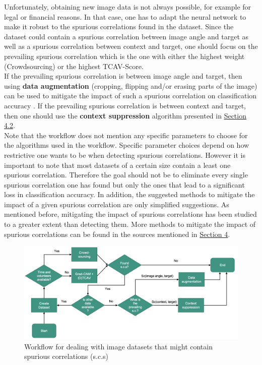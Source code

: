 \documentclass{article}
\begin{document}
Unfortunately, obtaining new image data is not always possible, for example for legal or financial reasons. In that case, one has to adapt the neural network
to make it robust to the spurious correlations found in the dataset. Since the dataset could contain a spurious correlation between image angle and target
as well as a spurious correlation between context and target, one should focus on the prevailing spurious correlation which is the one with either
the highest weight (Crowdsourcing) or the highest TCAV-Score. \\
If the prevailing spurious correlation is between image angle and target, then using \textbf{data augmentation} (cropping, flipping and/or erasing parts of the image)
can be used to mitigate the impact of such a spurious correlation on classification accuracy \cite{Agarwal_2020_CVPR}.
If the prevailing spurious correlation is between context and target, then one should use the \textbf{context suppression} algorithm presented in
\hyperref[sec:contextSuppr]{Section 4.2}. \\
Note that the workflow does not mention any specific parameters to choose for the algorithms used in the workflow. Specific parameter choices depend on how restrictive
one wants to be when detecting spurious correlations. However it is important to note that most datasets of a certain size contain a least one spurious correlation.
Therefore the goal should not be to eliminate every single spurious correlation one has found but only the ones that lead to a significant loss in
classification accuracy. In addition, the suggested methods to mitigate the impact of a given spurious correlation are only simplified suggestions.
As mentioned before, mitigating the impact of spurious correlations has been studied to a greater extent than detecting them. 
More methods to mitigate the impact of spurious correlations can be found in the sources mentioned in \hyperref[sec:mitigatingscs]{Section 4}.

\begin{figure}
    \centering
    \includegraphics[scale=0.42]{sc_workflow.png}
    \caption{Workflow for dealing with image datasets that might contain spurious correlations (s.c.s)}
    \label{fig:workflow}
\end{figure}
\end{document}
